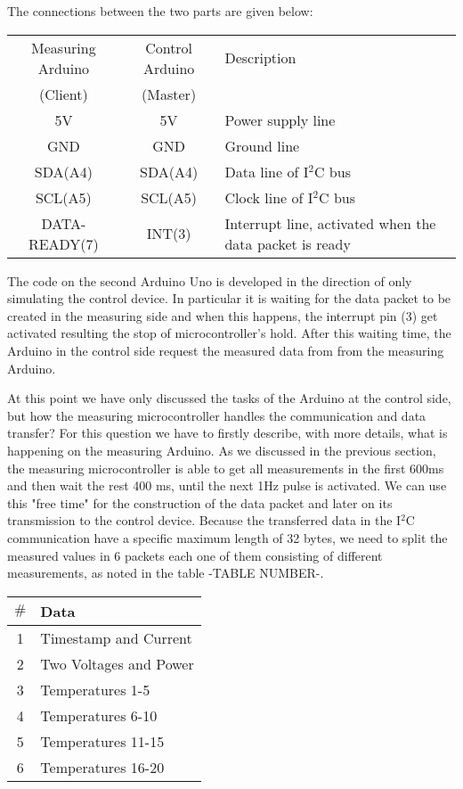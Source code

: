 The connections between the two parts are given below:

\begin{center}
\begin{tabular}{ c c p{5cm} } 
 Measuring Arduino & Control Arduino & Description \\
 (Client) & (Master) & \\\hline
 5V & 5V & Power supply line \\
 GND & GND & Ground line \\
 SDA(A4) & SDA(A4) & Data line of I$^2$C bus \\
 SCL(A5) & SCL(A5) & Clock line of I$^2$C bus \\
 DATA-READY(7) & INT(3) & Interrupt line, activated when the data packet is ready \\
\end{tabular}
\end{center}

The code on the second Arduino Uno is developed in the direction of only simulating the control device. In particular it is waiting for the data packet to be created in the measuring side and when this happens, the interrupt pin (3) get activated resulting the stop of microcontroller's hold. After this waiting time, the Arduino in the control side request the measured data from from the measuring Arduino.

At this point we have only discussed the tasks of the Arduino at the control side, but how the measuring microcontroller handles the communication and data transfer? For this question we have to firstly describe, with more details, what is happening on the measuring Arduino. As we discussed in the previous section, the measuring microcontroller is able to get all measurements in the first 600ms and then wait the rest 400 ms, until the next 1Hz pulse is activated. We can use this "free time"  for the construction of the data packet and later on its  transmission to the control device. Because the transferred data in the I$^2$C communication have a specific maximum length of 32 bytes, we need to split the measured values in 6 packets each one of them consisting of different measurements, as noted in the table -TABLE NUMBER-.

\begin{center}
\begin{tabular}{ c l } 
 $\#$ & Data \\ \hline
 1 &  Timestamp and Current\\
 2 &  Two Voltages and Power\\
 3 &  Temperatures 1-5\\
 4 &  Temperatures 6-10\\
 5 &  Temperatures 11-15\\
 6 &  Temperatures 16-20\\
\end{tabular}
\end{center}

